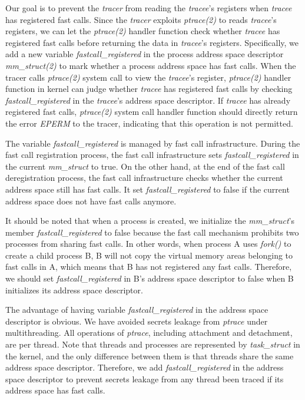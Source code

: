 Our goal is to prevent the \emph{tracer} from reading the 
\emph{tracee}'s registers when \emph{tracee} has registered fast calls. 
Since the \emph{tracer} exploits \emph{ptrace(2)} to reads \emph{tracee}'s registers, 
we can let the \emph{ptrace(2)} handler function check whether \emph{tracee} has 
registered fast calls before returning the data in \emph{tracee}'s registers.
Specifically, we add a new variable \emph{fastcall\_registered} 
in the process address space descriptor \emph{mm\_struct(2)}\cite{10.5555/983550} to mark whether a process
address space has fast calls. When the tracer calls \emph{ptrace(2)} system call 
to view the \emph{tracee}'s register, \emph{ptrace(2)} handler function in kernel can judge whether
\emph{tracee} has registered fast calls by checking \emph{fastcall\_registered} in 
the \emph{tracee}'s address space descriptor. If \emph{tracee} has already 
registered fast calls, \emph{ptrace(2)} system call handler function should 
directly return the error \emph{EPERM} to the tracer, indicating that this 
operation is not permitted.

The variable \emph{fastcall\_registered} is managed by fast call 
infrastructure. During the fast call registration process,  
the fast call infrastructure sets \emph{fastcall\_registered} in the current 
\emph{mm\_struct} to true. On the other hand, at the end of the fast call 
deregistration process, the fast call infrastructure checks whether 
the current address space still has fast calls. It set \emph{fastcall\_registered}  
to false if the current address space does not have fast calls anymore.


It should be noted that when a process is created, we initialize 
the \emph{mm\_struct}'s member \emph{fastcall\_registered}  to false because 
the fast call mechanism prohibits two processes from sharing fast calls.
 In other words, when process A uses \emph{fork()}\cite{18} to create a child process B, 
 B will not copy the virtual memory areas\cite{10.5555/983550}  belonging to fast calls in A, 
 which means that B has not registered any fast calls. 
 Therefore, we should set \emph{fastcall\_registered}  in B's address space 
 descriptor to false when B initializes its address space descriptor.

 The advantage of having variable \emph{fastcall\_registered} in the address space 
 descriptor is obvious.  We have avoided secrets leakage from \emph{ptrace} under 
 multithreading. All operations of \emph{ptrace}, including attachment and detachment, 
 are per thread. Note that threads and processes are represented by \emph{task\_struct}
 in the kernel, and the only difference between them is that threads share 
the same address space descriptor. Therefore, we add \emph{fastcall\_registered} 
in the address space descriptor to prevent secrets leakage from any thread 
been traced if its address space has fast calls.


